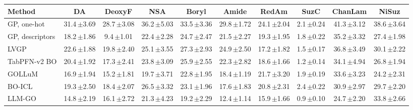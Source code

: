 \begin{table}[t]
\centering
\small
\setlength{\tabcolsep}{3.6pt}
\begin{tabular}{@{}l ccccccccc@{}}
\toprule
Method & DA & DeoxyF & NSA & Boryl & Amide & RedAm & SuzC & ChanLam & NiSuz \\
\midrule
GP, one-hot & 31.4\,{\scriptsize$\pm$3.69} & 28.7\,{\scriptsize$\pm$3.08} & 36.2\,{\scriptsize$\pm$5.03} & 33.5\,{\scriptsize$\pm$3.36} & 29.8\,{\scriptsize$\pm$1.72} & 24.1\,{\scriptsize$\pm$2.04} & 2.1\,{\scriptsize$\pm$0.24} & 41.3\,{\scriptsize$\pm$3.12} & 38.6\,{\scriptsize$\pm$3.64} \\
GP, descriptors & 18.2\,{\scriptsize$\pm$1.86} & 9.4\,{\scriptsize$\pm$1.01} & 22.4\,{\scriptsize$\pm$2.28} & 24.7\,{\scriptsize$\pm$2.47} & 21.5\,{\scriptsize$\pm$2.27} & 19.3\,{\scriptsize$\pm$1.95} & 1.8\,{\scriptsize$\pm$0.22} & 35.2\,{\scriptsize$\pm$3.32} & 27.4\,{\scriptsize$\pm$1.98} \\
LVGP & 22.6\,{\scriptsize$\pm$1.88} & 19.8\,{\scriptsize$\pm$2.40} & 25.1\,{\scriptsize$\pm$3.55} & 27.3\,{\scriptsize$\pm$2.93} & 24.9\,{\scriptsize$\pm$2.50} & 17.2\,{\scriptsize$\pm$1.82} & 1.5\,{\scriptsize$\pm$0.17} & 36.8\,{\scriptsize$\pm$3.49} & 30.1\,{\scriptsize$\pm$2.22} \\
TabPFN-v2 BO & 20.4\,{\scriptsize$\pm$1.92} & 17.3\,{\scriptsize$\pm$2.41} & 23.8\,{\scriptsize$\pm$3.09} & 25.9\,{\scriptsize$\pm$2.55} & 22.3\,{\scriptsize$\pm$2.82} & 18.6\,{\scriptsize$\pm$1.66} & 1.2\,{\scriptsize$\pm$0.14} & 34.1\,{\scriptsize$\pm$4.94} & 26.8\,{\scriptsize$\pm$1.94} \\
GOLLuM & 16.9\,{\scriptsize$\pm$1.94} & 15.2\,{\scriptsize$\pm$1.81} & 19.7\,{\scriptsize$\pm$3.71} & 22.8\,{\scriptsize$\pm$1.95} & 18.4\,{\scriptsize$\pm$1.19} & 21.7\,{\scriptsize$\pm$3.20} & 1.9\,{\scriptsize$\pm$0.19} & 33.6\,{\scriptsize$\pm$3.23} & 24.2\,{\scriptsize$\pm$2.31} \\
BO-ICL & 19.3\,{\scriptsize$\pm$2.50} & 18.4\,{\scriptsize$\pm$2.07} & 26.5\,{\scriptsize$\pm$3.32} & 23.1\,{\scriptsize$\pm$1.96} & 17.6\,{\scriptsize$\pm$1.83} & 20.8\,{\scriptsize$\pm$2.31} & 2.4\,{\scriptsize$\pm$0.22} & 30.9\,{\scriptsize$\pm$2.97} & 29.7\,{\scriptsize$\pm$2.20} \\
LLM-GO & 14.8\,{\scriptsize$\pm$2.19} & 16.1\,{\scriptsize$\pm$2.72} & 21.3\,{\scriptsize$\pm$4.23} & 19.2\,{\scriptsize$\pm$2.29} & 12.4\,{\scriptsize$\pm$1.14} & 15.9\,{\scriptsize$\pm$1.66} & 0.9\,{\scriptsize$\pm$0.10} & 24.7\,{\scriptsize$\pm$2.20} & 33.8\,{\scriptsize$\pm$2.66} \\

\end{tabular}
\end{table}
